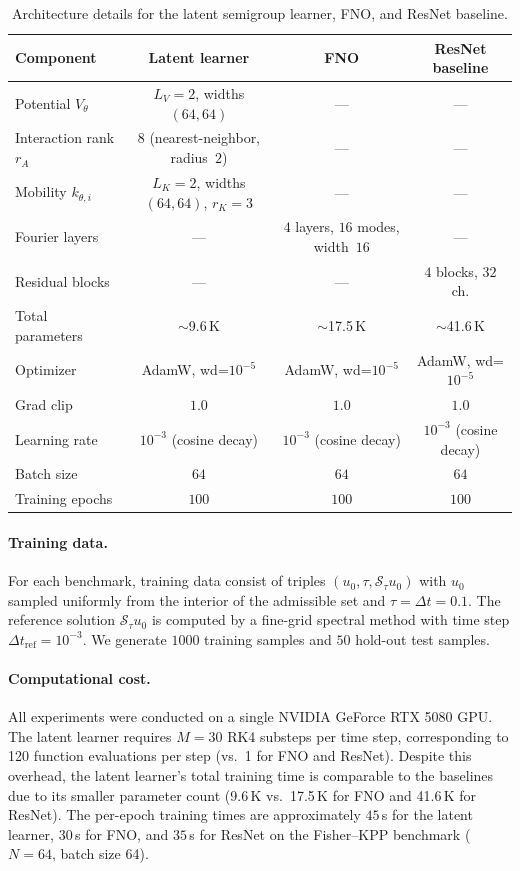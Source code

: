 \documentclass[11pt]{article}
\newcommand{\cS}{\mathcal{S}}
\begin{document}
\begin{table}[htbp]
\centering
\caption{Architecture details for the latent semigroup learner, FNO, and ResNet baseline.}
\label{tab:architecture}
\small
\begin{tabular}{@{}lccc@{}}
\hline
Component & Latent learner & FNO & ResNet baseline \\
\hline
Potential $V_{\theta}$ & $L_V{=}2$, widths $(64,64)$ & --- & --- \\
Interaction rank $r_A$ & $8$ (nearest-neighbor, radius~$2$) & --- & --- \\
Mobility $k_{\theta,i}$ & $L_K{=}2$, widths $(64,64)$, $r_K{=}3$ & --- & --- \\
Fourier layers & --- & $4$ layers, $16$ modes, width~$16$ & --- \\
Residual blocks & --- & --- & $4$ blocks, $32$ ch. \\
Total parameters & $\sim$9.6\,K & $\sim$17.5\,K & $\sim$41.6\,K \\
\hline
Optimizer & AdamW, wd=$10^{-5}$ & AdamW, wd=$10^{-5}$ & AdamW, wd=$10^{-5}$ \\
Grad clip & $1.0$ & $1.0$ & $1.0$ \\
Learning rate & $10^{-3}$ (cosine decay) & $10^{-3}$ (cosine decay) & $10^{-3}$ (cosine decay) \\
Batch size & $64$ & $64$ & $64$ \\
Training epochs & $100$ & $100$ & $100$ \\
\hline
\end{tabular}
\end{table}

\paragraph{Training data.}
For each benchmark, training data consist of triples $(u_0,\tau,\cS_{\tau}u_0)$ with $u_0$ sampled uniformly from the interior of the admissible set and $\tau=\Delta t=0.1$. The reference solution $\cS_{\tau}u_0$ is computed by a fine-grid spectral method with time step $\Delta t_{\mathrm{ref}}=10^{-3}$. We generate $1000$ training samples and $50$ hold-out test samples.

\paragraph{Computational cost.}
All experiments were conducted on a single NVIDIA GeForce RTX 5080 GPU. The latent learner requires $M=30$ RK4 substeps per time step, corresponding to 120 function evaluations per step (vs.\ 1 for FNO and ResNet). Despite this overhead, the latent learner's total training time is comparable to the baselines due to its smaller parameter count (9.6\,K vs.\ 17.5\,K for FNO and 41.6\,K for ResNet). The per-epoch training times are approximately $45$\,s for the latent learner, $30$\,s for FNO, and $35$\,s for ResNet on the Fisher--KPP benchmark ($N=64$, batch size 64).
\end{document}
